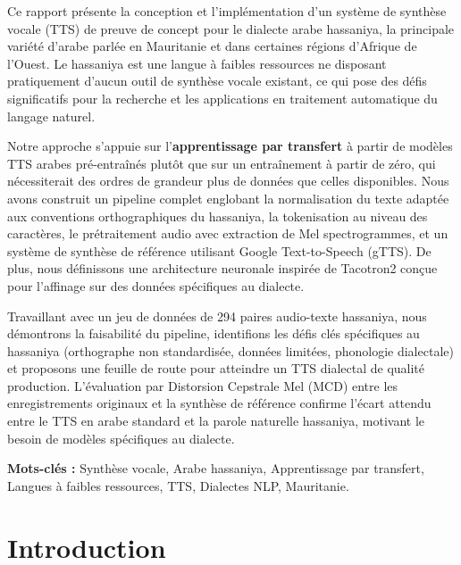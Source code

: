 \documentclass[12pt,a4paper]{article}
\begin{document}
Ce rapport présente la conception et l'implémentation d'un système de synthèse vocale (TTS) de preuve de concept pour le dialecte arabe hassaniya, la principale variété d'arabe parlée en Mauritanie et dans certaines régions d'Afrique de l'Ouest. Le hassaniya est une langue à faibles ressources ne disposant pratiquement d'aucun outil de synthèse vocale existant, ce qui pose des défis significatifs pour la recherche et les applications en traitement automatique du langage naturel.

Notre approche s'appuie sur l'\textbf{apprentissage par transfert} à partir de modèles TTS arabes pré-entraînés plutôt que sur un entraînement à partir de zéro, qui nécessiterait des ordres de grandeur plus de données que celles disponibles. Nous avons construit un pipeline complet englobant la normalisation du texte adaptée aux conventions orthographiques du hassaniya, la tokenisation au niveau des caractères, le prétraitement audio avec extraction de Mel spectrogrammes, et un système de synthèse de référence utilisant Google Text-to-Speech (gTTS). De plus, nous définissons une architecture neuronale inspirée de Tacotron2 conçue pour l'affinage sur des données spécifiques au dialecte.

Travaillant avec un jeu de données de 294 paires audio-texte hassaniya, nous démontrons la faisabilité du pipeline, identifions les défis clés spécifiques au hassaniya (orthographe non standardisée, données limitées, phonologie dialectale) et proposons une feuille de route pour atteindre un TTS dialectal de qualité production. L'évaluation par Distorsion Cepstrale Mel (MCD) entre les enregistrements originaux et la synthèse de référence confirme l'écart attendu entre le TTS en arabe standard et la parole naturelle hassaniya, motivant le besoin de modèles spécifiques au dialecte.

\textbf{Mots-clés :} Synthèse vocale, Arabe hassaniya, Apprentissage par transfert, Langues à faibles ressources, TTS, Dialectes NLP, Mauritanie.

\newpage

\tableofcontents
\newpage

\listoffigures
\listoftables
\newpage


\section{Introduction}
\label{sec:introduction}
\end{document}
